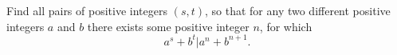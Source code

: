 Find all pairs of positive integers $(s, t)$,  so that for any two different positive integers $a$ and $b$ there exists some positive integer $n$,  for which $$a^s + b^t | a^n + b^{n+1}.$$